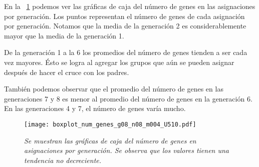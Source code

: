 En la \figurename{~\ref{boxplot_num_genes_x_generacion}} podemos ver las gráficas de caja del número de genes en las asignaciones por generación. Los puntos representan el número de genes de cada asignación por generación. Notamos que la media de la generación 2 es considerablemente mayor que la media de la generación 1.

De la generación 1 a la 6 los promedios del número de genes tienden a ser cada vez mayores. Ésto se logra al agregar los grupos que aún se pueden asignar después de hacer el cruce con los padres.

También podemos observar que el promedio del número de genes en las generaciones 7 y 8 es menor al promedio del número de genes en la generación 6. En las generaciones 4 y 7, el número de genes varía mucho.

\begin{figure}[h]
\centering
\texttt{[image: boxplot\_num\_genes\_g08\_n08\_m004\_U510.pdf]} %
\caption[\textit{Gráficas de caja del número de genes en asignaciones por generación}]{\textit{Se muestran las gráficas de caja del número de genes en asignaciones por generación. Se observa que los valores tienen una tendencia no decreciente.}}\label{boxplot_num_genes_x_generacion}
\end{figure}


%


